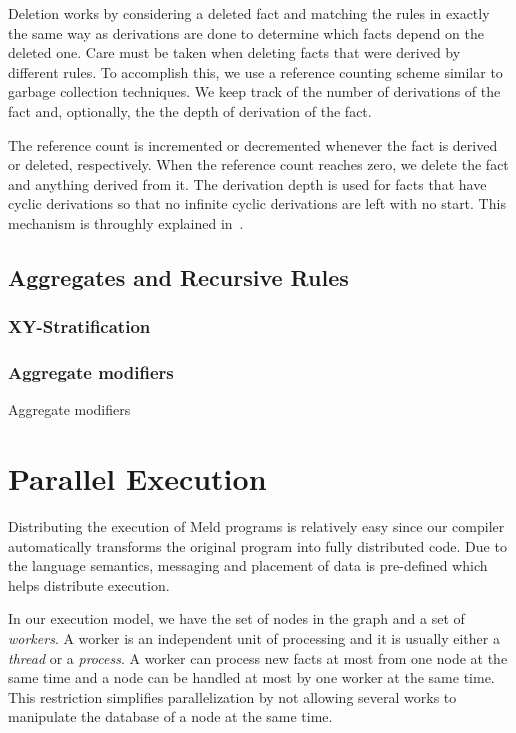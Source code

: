 \documentclass[preprint]{sigplanconf}
\begin{document}
Deletion works by considering a deleted fact and matching the rules in exactly the same way as
derivations are done to determine which facts depend on the deleted one. Care must be taken when
deleting facts that were derived by different rules. To accomplish this, we use a reference counting
scheme similar to garbage collection techniques. We
keep track of the number of derivations of the fact and, optionally, the
the depth of derivation of the fact.

The reference count is incremented or decremented whenever the fact is derived or
deleted, respectively. When the reference count reaches zero, we delete the fact and anything
derived from it. The derivation depth is used for facts that have cyclic derivations so that
no infinite cyclic derivations are left with no start.
This mechanism is throughly explained in~\cite{ashley-rollman-iclp09}.

\subsection{Aggregates and Recursive Rules}

\subsubsection{XY-Stratification}

\cite{zaniolo-arni-ong-dood93}

\subsubsection{Aggregate modifiers}

Aggregate modifiers 

\section{Parallel Execution}

Distributing the execution of Meld programs is relatively easy since our compiler automatically
transforms the original program into fully distributed code. Due to the language semantics,
messaging and placement of data is pre-defined which helps distribute execution.

In our execution model, we have the set of nodes in the graph and a set of \emph{workers}.
A worker is an independent unit of processing and it is usually either a \emph{thread} or
a \emph{process}. A worker can process new facts at most from one node at the same time and
a node can be handled at most by one worker at the same time. This restriction simplifies
parallelization by not allowing several works to manipulate the database of a node at the same time.
\end{document}
